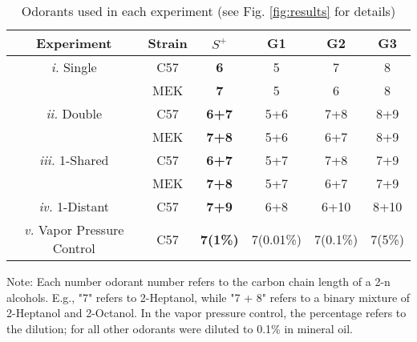 \begin{table}
\label{tab:design}
    \begin{tabular}{ c | c | c | c | c | c }
        Experiment & Strain & \textbf{$S^+$} & G1 & G2 & G3 \\ 
        \hline
        \textit{i.} Single & C57 & \textbf{6} & 5 & 7 & 8 \\ 
         & MEK & \textbf{7} & 5 & 6 & 8 \\ 
        \hline
        \textit{ii.} Double & C57 & \textbf{6+7} & 5+6 & 7+8 & 8+9 \\ 
         & MEK & \textbf{7+8} & 5+6 & 6+7 & 8+9 \\ 
        \hline
        \textit{iii.} 1-Shared & C57 & \textbf{6+7} & 5+7 & 7+8 & 7+9 \\ 
         & MEK & \textbf{7+8} & 5+7 & 6+7 & 7+9 \\ 
        \hline
        \textit{iv.} 1-Distant & C57 & \textbf{7+9} & 6+8 & 6+10 & 8+10 \\ 
        \hline
        \textit{v.} Vapor Pressure Control & C57 & \textbf{7(1\%)} & 7(0.01\%) & 7(0.1\%) & 7(5\%) \\ 
    \end{tabular}
    \caption{Odorants used in each experiment (see Fig. \ref{fig:results} for details)}
\end{table}
Note: Each number odorant number refers to the carbon chain length of a 2-n alcohols. E.g., "7" refers to 2-Heptanol, while "7 + 8" refers to a binary mixture of 2-Heptanol and 2-Octanol. In the vapor pressure control, the percentage refers to the dilution; for all other odorants were diluted to {0.1\%} in mineral oil.